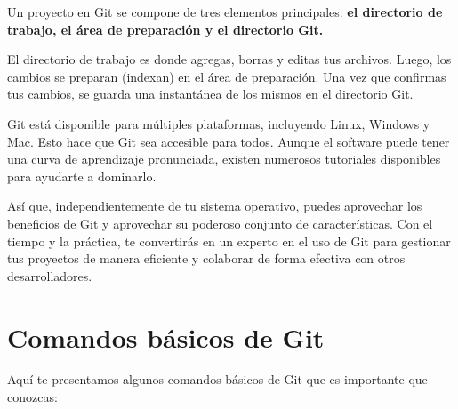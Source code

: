 \documentclass[
  a4paper,
]{article}
\begin{document}
Un proyecto en Git se compone de tres elementos principales: \textbf{el
directorio de trabajo, el área de preparación y el directorio Git.}

El directorio de trabajo es donde agregas, borras y editas tus archivos.
Luego, los cambios se preparan (indexan) en el área de preparación. Una
vez que confirmas tus cambios, se guarda una instantánea de los mismos
en el directorio Git.

Git está disponible para múltiples plataformas, incluyendo Linux,
Windows y Mac. Esto hace que Git sea accesible para todos. Aunque el
software puede tener una curva de aprendizaje pronunciada, existen
numerosos tutoriales disponibles para ayudarte a dominarlo.

Así que, independientemente de tu sistema operativo, puedes aprovechar
los beneficios de Git y aprovechar su poderoso conjunto de
características. Con el tiempo y la práctica, te convertirás en un
experto en el uso de Git para gestionar tus proyectos de manera
eficiente y colaborar de forma efectiva con otros desarrolladores.

\section{Comandos básicos de Git}\label{comandos-buxe1sicos-de-git}

Aquí te presentamos algunos comandos básicos de Git que es importante
que conozcas:
\end{document}
